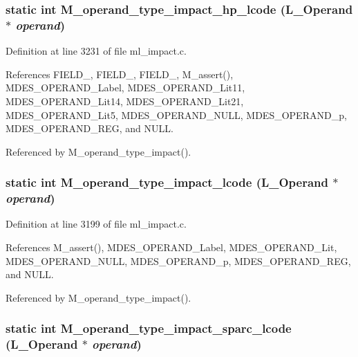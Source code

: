 \subsubsection{\setlength{\rightskip}{0pt plus 5cm}static int M\_\-operand\_\-type\_\-impact\_\-hp\_\-lcode (L\_\-Operand $\ast$ {\em operand})\hspace{0.3cm}{\tt  [static]}}\label{ml__impact_8c_9a4d0d218e376a446e1bdf4723c7b56c}




Definition at line 3231 of file ml\_\-impact.c.

References FIELD\_, FIELD\_, FIELD\_, M\_\-assert(), MDES\_\-OPERAND\_\-Label, MDES\_\-OPERAND\_\-Lit11, MDES\_\-OPERAND\_\-Lit14, MDES\_\-OPERAND\_\-Lit21, MDES\_\-OPERAND\_\-Lit5, MDES\_\-OPERAND\_\-NULL, MDES\_\-OPERAND\_\-p, MDES\_\-OPERAND\_\-REG, and NULL.

Referenced by M\_\-operand\_\-type\_\-impact().
\subsubsection{\setlength{\rightskip}{0pt plus 5cm}static int M\_\-operand\_\-type\_\-impact\_\-lcode (L\_\-Operand $\ast$ {\em operand})\hspace{0.3cm}{\tt  [static]}}\label{ml__impact_8c_ed74c402461c02cfb1e1572f1bbdc674}




Definition at line 3199 of file ml\_\-impact.c.

References M\_\-assert(), MDES\_\-OPERAND\_\-Label, MDES\_\-OPERAND\_\-Lit, MDES\_\-OPERAND\_\-NULL, MDES\_\-OPERAND\_\-p, MDES\_\-OPERAND\_\-REG, and NULL.

Referenced by M\_\-operand\_\-type\_\-impact().
\subsubsection{\setlength{\rightskip}{0pt plus 5cm}static int M\_\-operand\_\-type\_\-impact\_\-sparc\_\-lcode (L\_\-Operand $\ast$ {\em operand})\hspace{0.3cm}{\tt  [static]}}\label{ml__impact_8c_8adfe0f0b7bc2f7fb372f518b9c3493f}




